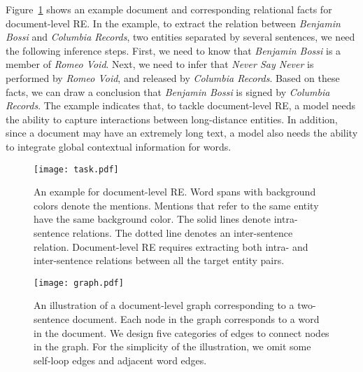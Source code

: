 \documentclass{article}
\begin{document}
Figure~\ref{fig:task} shows an example document and corresponding relational facts for document-level RE. 
In the example, to extract the relation between \textit{Benjamin Bossi} and \textit{Columbia Records}, two entities separated by several sentences, we need the following inference steps. 
First, we need to know that \textit{Benjamin Bossi} is a member of \textit{Romeo Void}. 
Next, we need to infer that \textit{Never Say Never} is performed by \textit{Romeo Void}, and released by \textit{Columbia Records}. 
Based on these facts, we can draw a conclusion that \textit{Benjamin Bossi} is signed by \textit{Columbia Records}. 
The example indicates that, to tackle document-level RE, a model needs the ability to capture interactions between long-distance entities. 
In addition, since a document may have an extremely long text, a model also needs the ability to integrate global contextual information for words. 

\begin{figure}[t]
\centering
\texttt{[image: task.pdf]}
\caption{
An example for document-level RE. 
Word spans with background colors denote the mentions. 
Mentions that refer to the same entity have the same background color.
The solid lines denote intra-sentence relations. 
The dotted line denotes an inter-sentence relation. 
Document-level RE requires extracting both intra- and inter-sentence relations between all the target entity pairs. 
}
\label{fig:task}
\end{figure}

\begin{figure*}[t]
\centering
\texttt{[image: graph.pdf]}
\caption{
An illustration of a document-level graph corresponding to a two-sentence document. 
Each node in the graph corresponds to a word in the document. 
We design five categories of edges to connect nodes in the graph. 
For the simplicity of the illustration, we omit some self-loop edges and adjacent word edges. 
}
\label{fig:graph}
\end{figure*}
 
\end{document}
